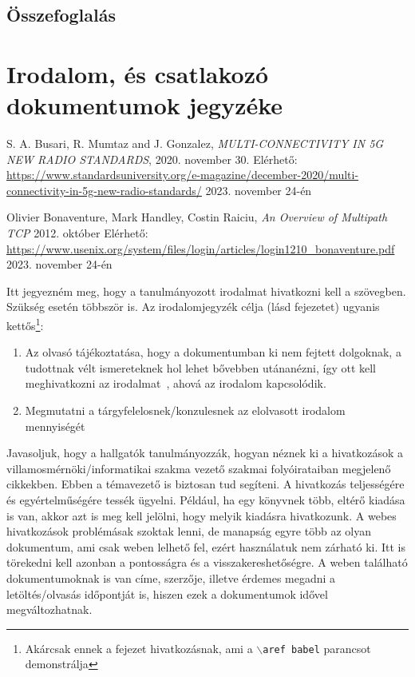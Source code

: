 \documentclass[a4paper,oneside]{article}
\begin{document}
\newpage

\subsection{Összefoglalás}
\label{sec:osszefoglalas}

\newpage
 
\section{Irodalom, és csatlakozó dokumentumok jegyzéke}
\label{sec:irod-es-csatl}

\begin{thebibliography}{9}
\label{sec:tanulm-irod-jegyz}

 S. A. Busari, R. Mumtaz and J. Gonzalez,
\emph{MULTI-CONNECTIVITY IN 5G NEW RADIO STANDARDS},
2020. november 30.
Elérhető: \url{https://www.standardsuniversity.org/e-magazine/december-2020/multi-connectivity-in-5g-new-radio-standards/}
2023. november 24-én

 Olivier Bonaventure, Mark Handley, Costin Raiciu,
\emph{An Overview of Multipath TCP}
2012. október
Elérhető: \url{https://www.usenix.org/system/files/login/articles/login1210_bonaventure.pdf}
2023. november 24-én

\end{thebibliography}

Itt jegyezném meg, hogy a tanulmányozott irodalmat hivatkozni kell a
szövegben.  Szükség esetén többször is.  Az irodalomjegyzék célja
(lásd  fejezetet) ugyanis
kettős\footnote{Akárcsak ennek a fejezet hivatkozásnak, ami a
  \texttt{$\backslash$aref babel} parancsot demonstrálja}:
\begin{enumerate}
\item Az olvasó tájékoztatása, hogy a dokumentumban ki nem fejtett
  dolgoknak, a tudottnak vélt ismereteknek hol lehet bővebben
  utánanézni, így ott kell meghivatkozni az irodalmat~\cite{eco,
    esterhazy}, ahová az irodalom kapcsolódik.
\item Megmutatni a tárgyfelelosnek/konzulesnek az elolvasott irodalom
  mennyiségét
\end{enumerate}

Javasoljuk, hogy a hallgatók tanulmányozzák, hogyan néznek ki a
hivatkozások a villamosmérnöki/informatikai szakma vezető szakmai
folyóirataiban megjelenő cikkekben.  Ebben a témavezető is biztosan
tud segíteni.  A hivatkozás teljességére és egyértelműségére tessék
ügyelni.  Például, ha egy könyvnek több, eltérő kiadása is van, akkor
azt is meg kell jelölni, hogy melyik kiadásra hivatkozunk.  A webes
hivatkozások problémásak szoktak lenni, de manapság egyre több az
olyan dokumentum, ami csak weben lelhető fel, ezért használatuk nem
zárható ki. Itt is törekedni kell azonban a pontosságra és a
visszakereshetőségre. A weben található dokumentumoknak is van címe,
szerzője, illetve érdemes megadni a letöltés/olvasás időpontját is,
hiszen ezek a dokumentumok idővel megváltozhatnak.
\end{document}
